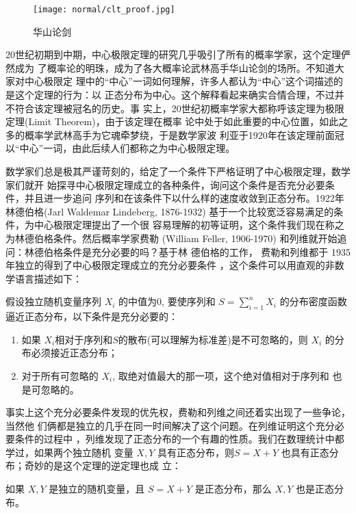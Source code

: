 \begin{figure}[htbp]
\centering
\texttt{[image: normal/clt\_proof.jpg]}
\caption{华山论剑}
\end{figure}

20世纪初期到中期，中心极限定理的研究几乎吸引了所有的概率学家，这个定理俨然成为
了概率论的明珠，成为了各大概率论武林高手华山论剑的场所。不知道大家对中心极限定
理中的“中心”一词如何理解，许多人都认为“中心”这个词描述的是这个定理的行为：以
正态分布为中心。这个解释看起来确实合情合理，不过并不符合该定理被冠名的历史。事
实上，20世纪初概率学家大都称呼该定理为极限定理(Limit Theorem)，由于该定理在概率
论中处于如此重要的中心位置，如此之多的概率学武林高手为它魂牵梦绕，于是数学家波
利亚于1920年在该定理前面冠以“中心”一词，由此后续人们都称之为中心极限定理。

数学家们总是极其严谨苛刻的，给定了一个条件下严格证明了中心极限定理，数学家们就开
始探寻中心极限定理成立的各种条件，询问这个条件是否充分必要条件，并且进一步追问
序列和在该条件下以什么样的速度收敛到正态分布。1922年林德伯格(Jarl Waldemar
Lindeberg, 1876-1932) 基于一个比较宽泛容易满足的条件，为中心极限定理提出了一个很
容易理解的初等证明，这个条件我们现在称之为林德伯格条件。然后概率学家费勒
(William Feller, 1906-1970) 和列维就开始追问：林德伯格条件是充分必要的吗？基于林
德伯格的工作， 费勒和列维都于 1935 年独立的得到了中心极限定理成立的充分必要条件
，这个条件可以用直观的非数学语言描述如下：

\begin{theorem}[中心极限定理充要条件]
假设独立随机变量序列 $X_i$ 的中值为0, 要使序列和 $\displaystyle S=\sum_{i=1}^n
X_i$ 的分布密度函数逼近正态分布，以下条件是充分必要的：
\begin{enumerate}
\item 如果 $X_i$相对于序列和$S$的散布(可以理解为标准差)是不可忽略的，则 $X_i$ 的分
      布必须接近正态分布；
\item 对于所有可忽略的 $X_i$, 取绝对值最大的那一项，这个绝对值相对于序列和
      也是可忽略的。
\end{enumerate}
\end{theorem}

事实上这个充分必要条件发现的优先权，费勒和列维之间还着实出现了一些争论，当然他
们俩都是独立的几乎在同一时间解决了这个问题。在列维证明这个充分必要条件的过程中
，列维发现了正态分布的一个有趣的性质。我们在数理统计中都学过，如果两个独立随机
变量 $X,Y$ 具有正态分布，则$S=X+Y$ 也具有正态分布；奇妙的是这个定理的逆定理也成
立：

\begin{theorem}[正态分布的血统]
如果 $X,Y$ 是独立的随机变量，且 $S=X+Y$ 是正态分布，那么 $X,Y$ 也是正态分布。
\end{theorem}


